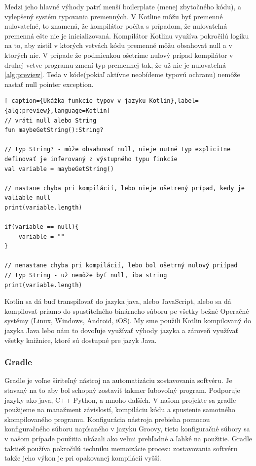 Medzi jeho hlavné výhody patrí menší boilerplate (menej zbytočného kódu), a vylepšený systém typovania premenných. V Kotline  môžu byť premenné nulovateľné, to znamená, že kompilátor počíta s prípadom, že nulovateľná premenná ešte nie je inicializovaná. Kompilátor Kotlinu využíva pokročilú logiku na to, aby zistil v ktorých vetvách kódu premenné môžu obsahovať null a v ktorých nie. V prípade že podmienkou ošetríme nulový prípad kompilátor v druhej vetve programu zmení typ premennej tak, že už nie je nulovateľná \ref{alg:preview}. Teda v kóde(pokiaľ aktívne neobídeme typovú ochranu) nemôže nastať null pointer exception.

\begin{lstlisting}[ caption={Ukážka funkcie typov v jazyku Kotlin},label={alg:preview},language=Kotlin]
// vráti null alebo String
fun maybeGetString():String?

// typ String? - môže obsahovať null, nieje nutné typ explicitne definovať je inferovaný z výstupného typu finkcie
val variable = maybeGetString()

// nastane chyba pri kompilácií, lebo nieje ošetrený prípad, kedy je valiable null
print(variable.length)

if(variable == null){
	variable = ""
}

// nenastane chyba pri kompilácií, lebo bol ošetrný nulový priípad
// typ String - už nemôže byť null, iba string
print(variable.length)
\end{lstlisting}

Kotlin sa dá buď transpilovať do jazyka java, alebo JavaScript, alebo sa dá kompilovať priamo do spustiteľného  binárneho súboru pe všetky bežné Operačné systémy (Linux, Windows, Android, iOS).
My sme použili Kotlin kompilovaný do jazyka Java lebo nám to dovoľuje využívať výhody jazyka a zároveň využívať všetky knižnice, ktoré sú dostupné pre jazyk Java.

\subsubsection{Gradle}
Gradle je voľne šíriteľný nástroj na automatizáciu zostavovania softvéru. Je stavaný na to aby bol schopný zostaviť takmer ľubovoľný program. Podporuje jazyky ako java, C++ Python, a mnoho ďalších. V našom projekte sa gradle použijeme na manažment závislostí, kompiláciu kódu a spustenie samotného skompilovaného programu. Konfigurácia nástroja prebieha pomocou konfiguračného súboru napísaného v jazyku Groovy, tieto konfiguračné  súbory sa v našom prípade použitia ukázali ako veľmi prehľadné a ľahké na použitie. Gradle taktiež používa pokročilú techniku memoizácie procesu zostavovania softvéru takže jeho výkon je pri opakovanej kompilácií vyšší.


